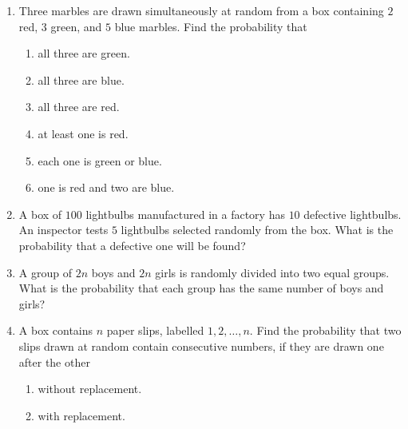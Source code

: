 \documentclass[svgnames]{amsart}
\begin{document}
\begin{enumerate}[leftmargin=*]
\item Three marbles are drawn simultaneously at random from a box containing $2$ red, $3$ green, and $5$ blue marbles. Find the probability that
\begin{enumerate}
	\item all three are green.
	\item all three are blue.
	\item all three are red.
	\item at least one is red.
	\item each one is green or blue.
	\item one is red and two are blue.
\end{enumerate}

\item A box of $100$ lightbulbs manufactured in a factory has $10$ defective lightbulbs. An inspector tests $5$ lightbulbs selected randomly from the box. What is the probability that a defective one will be found?

\item A group of $2n$ boys and $2n$ girls is randomly divided into two equal groups. What is the probability that each group has the same number of boys and girls?

\item A box contains $n$ paper slips, labelled $1, 2, \ldots, n$. Find the probability that two slips drawn at random contain consecutive numbers, if they are drawn one after the other
\begin{enumerate}
	\item without replacement.
	\item with replacement.
\end{enumerate}
\end{enumerate} %
\end{document}
